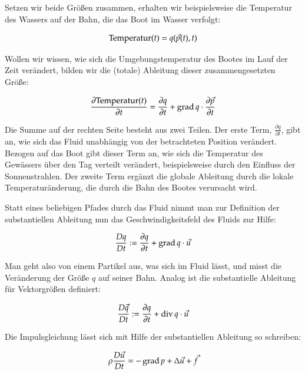 Setzen wir beide Größen zusammen, erhalten wir beispielsweise die
Temperatur des Wassers auf der Bahn, die das Boot im Wasser verfolgt:

\begin{equation}
\textnormal{Temperatur}(t) = q(\vec{p}(t),t)
\end{equation}

Wollen wir wissen, wie sich die Umgebungstemperatur des Bootes im Lauf
der Zeit verändert, bilden wir die (totale) Ableitung dieser
zusammengesetzten Größe:

\begin{equation}
\frac{
	\partial \textnormal{Temperatur}(t)
}
{
	\partial t
}
=
\frac{
	\partial q
}
{
	\partial t
}
+
\operatorname*{grad} q \cdot
\frac{
	\partial \vec{p}}
{
	\partial t
}
\end{equation}

Die Summe auf der rechten Seite besteht aus zwei Teilen. Der erste Term,
$\frac{\partial q}{\partial t}$, gibt an, wie sich das Fluid unabhängig von
der betrachteten Position verändert. Bezogen auf das Boot gibt dieser
Term an, wie sich die Temperatur des Gewässers über den Tag verteilt
verändert, beispielsweise durch den Einfluss der Sonnenstrahlen. Der
zweite Term ergänzt die globale Ableitung durch die lokale
Temperaturänderung, die durch die Bahn des Bootes verursacht
wird.

Statt eines beliebigen Pfades durch das Fluid nimmt man zur Definition der
substantiellen Ableitung nun das Geschwindigkeitsfeld des Fluids zur Hilfe:

\begin{equation}
\frac{
	Dq}
{
	Dt
} :=
\frac{
	\partial q
}
{
	\partial t
}
+
\operatorname*{grad} q \cdot
\vec{u}
\end{equation}

Man geht also von einem Partikel aus, was sich im Fluid 
lässt, und misst die Veränderung der Größe $q$ auf seiner Bahn. Analog ist die
substantielle Ableitung für Vektorgrößen definiert:

\begin{equation}
\frac{
	D\vec{q}}
{
	Dt
} :=
\frac{
	\partial q
}
{
	\partial t
}
+
\operatorname*{div} q \cdot
\vec{u}
\end{equation}

Die Impulsgleichung lässt sich mit Hilfe der substantiellen Ableitung so schreiben:

\begin{equation}
\rho \frac{D\vec{u}}{Dt} = - \operatorname*{grad} p + \Delta \vec{u} + \vec{f}
\end{equation}

